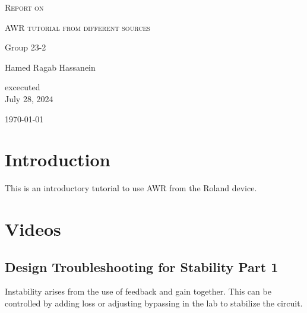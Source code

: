 \documentclass[english]{article}
\begin{document}

\begin{titlepage}
	\centering
	{\scshape\LARGE Report on \par}
	\vspace{1cm}
	{\scshape\huge AWR tutorial from different sources \par}
	\vspace{2.5cm}
	{\LARGE Group 23-2\par}
	\vspace{0.5cm}
	{\large Hamed Ragab Hassanein  \par}



	\vfill
 excecuted \\
 July 28, 2024
 \vfill

	{\large \today \par}
\end{titlepage}


\tableofcontents



\section{Introduction}
This is an introductory tutorial to use AWR from the Roland device.

\section{Videos}

\subsection{Design Troubleshooting for Stability Part 1}
Instability arises from the use of feedback and gain together. This can be controlled by adding loss or adjusting bypassing in the lab to stabilize the circuit.
\end{document}
